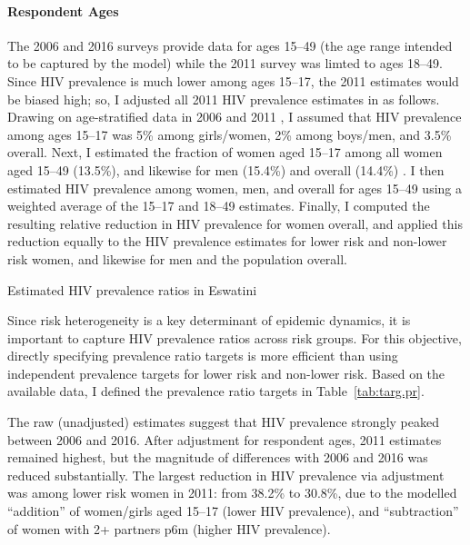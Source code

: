 \paragraph{Respondent Ages}
The 2006 and 2016 surveys provide data for ages 15--49
(the age range intended to be captured by the model)
while the 2011 survey was limted to ages 18--49.
Since HIV prevalence is much lower among ages 15--17,
the 2011 estimates would be biased high;
so, I adjusted all 2011 HIV prevalence estimates in as follows.
Drawing on age-stratified data in 2006 \cite{SDHS2006} and 2011 \cite{Bicego2013},
I assumed that HIV prevalence among ages 15--17 was
5\% among girls/women, 2\% among boys/men, and 3.5\% overall.
Next, I estimated the fraction of women aged 15--17 among all women aged 15--49 (13.5\%),
and likewise for men (15.4\%) and overall (14.4\%) \cite{DataBank}.
I then estimated HIV prevalence among women, men, and overall for ages 15--49
using a weighted average of the 15--17 and 18--49 estimates.
Finally, I computed the resulting relative reduction in HIV prevalence for women overall,
and applied this reduction equally to the HIV prevalence estimates for
lower risk and non-lower risk women, and likewise for men and the population overall.
\par
\begin{table}
  \centering
  \caption{Estimated HIV prevalence ratios in Eswatini}
  \label{tab:targ.pr}
  
\end{table}
Since risk heterogeneity is a key determinant of epidemic dynamics,
it is important to capture HIV prevalence ratios across risk groups.
For this objective, directly specifying prevalence ratio targets is more efficient than
using independent prevalence targets for lower risk and non-lower risk.
Based on the available data, I defined the prevalence ratio targets in Table~\ref{tab:targ.pr}.
\par
The raw (unadjusted) estimates suggest that HIV prevalence strongly peaked between 2006 and 2016.
After adjustment for respondent ages, 2011 estimates remained highest,
but the magnitude of differences with 2006 and 2016 was reduced substantially.
The largest reduction in HIV prevalence via adjustment
was among lower risk women in 2011: from 38.2\% to 30.8\%, due to the modelled
``addition'' of women/girls aged 15--17 (lower HIV prevalence), and
``subtraction'' of women with 2+ partners p6m (higher HIV prevalence).
